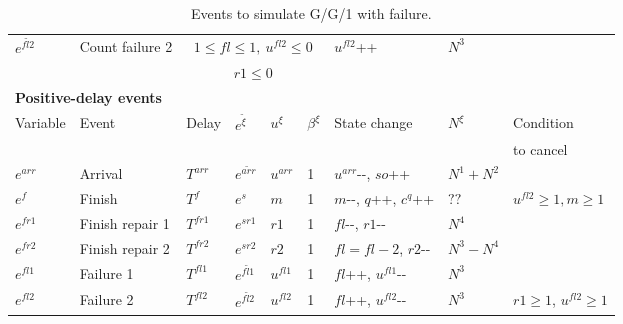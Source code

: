 \documentclass[]{interact}
\theoremstyle{plain}%
\theoremstyle{definition}
\theoremstyle{remark}
\begin{document}
\begin{table}[h]
\begin{tabular}{lllllllll}
		$e^{\tilde{fl2}}$ & Count failure 2 & \multicolumn{4}{c}{$1\le fl\le 1,\ u^{fl2}\le 0$} & $u^{fl2}${\footnotesize++} &$N^3$&\\	
		&& \multicolumn{4}{c}{$r1\le 0$} &&&\\	
		\multicolumn{9}{l}{\textbf{Positive-delay events}}\\\hline
		Variable&Event 		   & Delay& $e^{\tilde{\xi}}$& $u^{\xi}$ &$\beta^{\xi}$& State change&$N^{\xi}$&Condition \\
		&&&&&&&&to cancel\\\hline
		$e^{arr}$&Arrival & $T^{arr}$& $e^{\tilde{arr}}$&  $u^{arr}$&1&  $u^{arr}${\small-}{\small-},  $so${\footnotesize++}&$N^1+N^2$&\\
		$e^{f}$&Finish & $T^{f}$& $e^{s}$&  $m$&1&  $m${\small-}{\small-},  $q${\footnotesize++}, $c^q${\footnotesize++}&$??$&$u^{fl2}\ge 1, m\ge 1$\\	
		$e^{fr1}$&Finish repair 1 & $T^{fr1}$& $e^{sr1}$&  $r1$&1& $fl${\small-}{\small-}, $r1${\small-}{\small-} &$N^4$&\\
		$e^{fr2}$&Finish repair 2 & $T^{fr2}$& $e^{sr2}$&  $r2$&1& $fl=fl-2$, $r2${\small-}{\small-}  &$N^3-N^4$&\\
		$e^{fl1}$&Failure 1 & $T^{fl1}$& $e^{\tilde{fl1}}$&  $u^{fl1}$&1& $fl${\footnotesize++}, $u^{fl1}${\small-}{\small-} &$N^3$&\\
		$e^{fl2}$&Failure 2 & $T^{fl2}$& $e^{\tilde{fl2}}$&  $u^{fl2}$&1& $fl${\footnotesize++}, $u^{fl2}${\small-}{\small-}  &$N^3$&$r1\ge 1$, $u^{fl2}\ge 1$\\	
		\hline
	\end{tabular}
	\caption{Events to simulate G/G/1 with failure.}
	\label{tab:maintenance}
\end{table}
\end{document}
